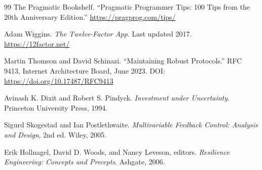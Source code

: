 \documentclass[11pt,a4paper]{ctexart}
\numberwithin{equation}{section}
\theoremstyle{definition}
\theoremstyle{plain}
\begin{document}
\begin{thebibliography}{99}
The Pragmatic Bookshelf.
\newblock ``Pragmatic Programmer Tips: 100 Tips from the 20th Anniversary Edition.''
\newblock \url{https://pragprog.com/tips/}

Adam Wiggins.
\newblock \textit{The Twelve-Factor App}.
\newblock Last updated 2017.
\newblock \url{https://12factor.net/}

Martin Thomson and David Schinazi.
\newblock ``Maintaining Robust Protocols.''
\newblock RFC 9413, Internet Architecture Board, June 2023.
\newblock DOI: \url{https://doi.org/10.17487/RFC9413}

Avinash K. Dixit and Robert S. Pindyck.
\newblock \textit{Investment under Uncertainty}.
\newblock Princeton University Press, 1994.

Sigurd Skogestad and Ian Postlethwaite.
\newblock \textit{Multivariable Feedback Control: Analysis and Design}, 2nd ed.
\newblock Wiley, 2005.

Erik Hollnagel, David D. Woods, and Nancy Leveson, editors.
\newblock \textit{Resilience Engineering: Concepts and Precepts}.
\newblock Ashgate, 2006.

\end{thebibliography}
\end{document}

